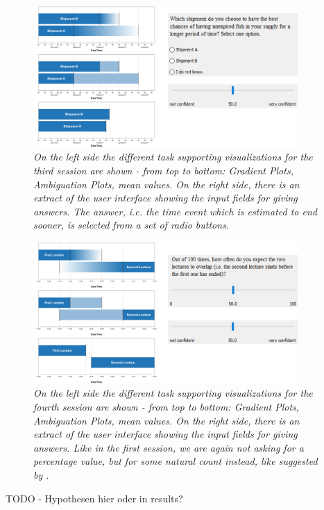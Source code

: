 \begin{figure}[H]
	\centering
	\includegraphics[width=0.9\textwidth]{figures/EvalBench_session3.png}
	\caption{\textit{On the left side the different task supporting visualizations for the third session are shown - from top to bottom: Gradient Plots, Ambiguation Plots, mean values. On the right side, there is an extract of the user interface showing the input fields for giving answers. The answer, i.e. the time event which is estimated to end sooner, is selected from a set of radio buttons.}}
	\label{fig:EvalBench_session3}
\end{figure}

\begin{figure}[H]
	\centering
	\includegraphics[width=0.9\textwidth]{figures/EvalBench_session4.png}
	\caption{\textit{On the left side the different task supporting visualizations for the fourth session are shown - from top to bottom: Gradient Plots, Ambiguation Plots, mean values. On the right side, there is an extract of the user interface showing the input fields for giving answers. Like in the first session, we are again not asking for a percentage value, but for some natural count instead, like suggested by \citet{hullman2016evaluating}.}}
	\label{fig:EvalBench_session4}
\end{figure}

TODO - Hypothesen hier oder in results?
